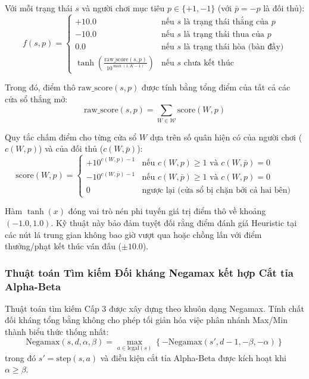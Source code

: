 \documentclass[a4paper,12pt]{report}
\begin{document}
Với mỗi trạng thái $s$ và người chơi mục tiêu $p \in \{+1, -1\}$ (với $\bar{p} = -p$ là đối thủ):
\begin{equation}
f(s, p) = \begin{cases}
+10.0 & \text{nếu } s \text{ là trạng thái thắng của } p \\
-10.0 & \text{nếu } s \text{ là trạng thái thua của } p \\
0.0 & \text{nếu } s \text{ là trạng thái hòa (bàn đầy)} \\
\tanh\left(\frac{\text{raw\_score}(s, p)}{10^{\max(1, K-1)}}\right) & \text{nếu } s \text{ chưa kết thúc}
\end{cases}
\end{equation}

Trong đó, điểm thô $\text{raw\_score}(s, p)$ được tính bằng tổng điểm của tất cả các cửa sổ thắng mở:
\begin{equation}
\text{raw\_score}(s, p) = \sum_{W \in \mathcal{W}} \text{score}(W, p)
\end{equation}

Quy tắc chấm điểm cho từng cửa sổ $W$ dựa trên số quân hiện có của người chơi ($c(W, p)$) và của đối thủ ($c(W, \bar{p})$):
\begin{equation}
\text{score}(W, p) = \begin{cases}
+10^{c(W, p) - 1} & \text{nếu } c(W, p) \ge 1 \text{ và } c(W, \bar{p}) = 0 \\
-10^{c(W, \bar{p}) - 1} & \text{nếu } c(W, \bar{p}) \ge 1 \text{ và } c(W, p) = 0 \\
0 & \text{ngược lại (cửa sổ bị chặn bởi cả hai bên)}
\end{cases}
\end{equation}

Hàm $\tanh(x)$ đóng vai trò nén phi tuyến giá trị điểm thô về khoảng $(-1.0, 1.0)$. Kỹ thuật này bảo đảm tuyệt đối rằng điểm đánh giá Heuristic tại các nút lá trung gian không bao giờ vượt qua hoặc chồng lấn với điểm thưởng/phạt kết thúc ván đấu ($\pm 10.0$).

\subsubsection{Thuật toán Tìm kiếm Đối kháng Negamax kết hợp Cắt tỉa Alpha-Beta}
Thuật toán tìm kiếm Cấp 3 được xây dựng theo khuôn dạng Negamax. Tính chất đối kháng tổng bằng không cho phép tối giản hóa việc phân nhánh Max/Min thành biểu thức thống nhất:
\begin{equation}
\text{Negamax}(s, d, \alpha, \beta) = \max_{a \in \text{legal}(s)} \left\{ -\text{Negamax}(s', d - 1, -\beta, -\alpha) \right\}
\end{equation}
trong đó $s' = \text{step}(s, a)$ và điều kiện cắt tỉa Alpha-Beta được kích hoạt khi $\alpha \ge \beta$.
\end{document}
